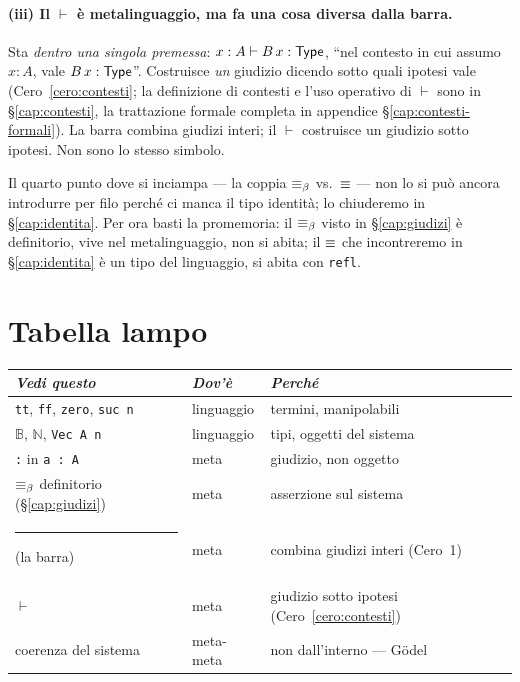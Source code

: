 \paragraph{(iii) Il $\vdash$ \`e metalinguaggio, ma fa una cosa diversa dalla barra.}
Sta \emph{dentro una singola premessa}: $x : A \vdash B\,x : \mathsf{Type}$, ``nel contesto in cui assumo $x : A$, vale $B\,x : \mathsf{Type}$''. Costruisce \emph{un} giudizio dicendo sotto quali ipotesi vale (Cero~\ref{cero:contesti}; la definizione di contesti e l'uso operativo di $\vdash$ sono in \S\ref{cap:contesti}, la trattazione formale completa in appendice \S\ref{cap:contesti-formali}). La barra combina giudizi interi; il $\vdash$ costruisce un giudizio sotto ipotesi. Non sono lo stesso simbolo.

\bigskip

\noindent Il quarto punto dove si inciampa --- la coppia $\equiv_{\beta}$ vs.\ $\equiv$ --- non lo si pu\`o ancora introdurre per filo perch\'e ci manca il tipo identit\`a; lo chiuderemo in \S\ref{cap:identita}. Per ora basti la promemoria: il $\equiv_{\beta}$ visto in \S\ref{cap:giudizi} \`e definitorio, vive nel metalinguaggio, non si abita; il $\equiv$ che incontreremo in \S\ref{cap:identita} \`e un tipo del linguaggio, si abita con \texttt{refl}.

\section*{Tabella lampo}

\begin{center}
\renewcommand{\arraystretch}{1.15}
\begin{tabular}{lll}
\toprule
\textit{Vedi questo} & \textit{Dov'\`e} & \textit{Perch\'e} \\
\midrule
\texttt{tt}, \texttt{ff}, \texttt{zero}, \texttt{suc n} & linguaggio & termini, manipolabili \\
$\mathbb{B}$, $\mathbb{N}$, \texttt{Vec A n} & linguaggio & tipi, oggetti del sistema \\
\texttt{:} in \texttt{a : A} & meta & giudizio, non oggetto \\
$\equiv_{\beta}$ definitorio (\S\ref{cap:giudizi}) & meta & asserzione sul sistema \\
\rule{0.9cm}{0.3pt} (la barra) & meta & combina giudizi interi (Cero~1) \\
$\vdash$ & meta & giudizio sotto ipotesi (Cero~\ref{cero:contesti}) \\
coerenza del sistema & meta-meta & non dall'interno --- G\"odel \\
\bottomrule
\end{tabular}
\end{center}

